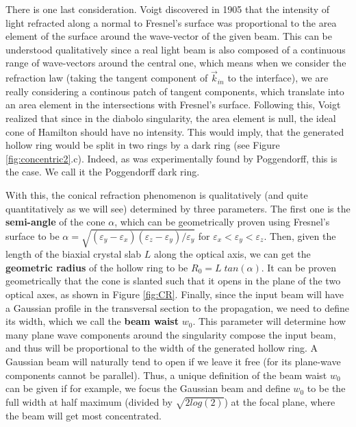 \documentclass[11pt, a4paper, twoside]{article} %
\begin{document}
There is one last consideration. Voigt discovered in 1905 \cite{voigt, Jeffrey} that the intensity of light refracted along a normal to Fresnel's surface was proportional to the area element of the surface around the wave-vector of the given beam. This can be understood qualitatively since a real light beam is also composed of a continuous range of wave-vectors around the central one, which means when we consider the refraction law (taking the tangent component of $\vec{k}_{in}$ to the interface), we are really considering a continous patch of tangent components, which translate into an area element in the intersections with Fresnel's surface. Following this, Voigt realized that since in the diabolo singularity, the area element is null, the ideal cone of Hamilton should have no intensity. This would imply, that the generated hollow ring would be split in two rings by a dark ring (see Figure \ref{fig:concentric2}.c). Indeed, as was experimentally found by Poggendorff, this is the case. We call it the Poggendorff dark ring.

With this, the conical refraction phenomenon is qualitatively (and quite quantitatively as we will see) determined by three parameters. The first one is the {\bf semi-angle} of the cone $\alpha$, which can be geometrically proven using Fresnel's surface to be $\alpha=\sqrt{(\varepsilon_y-\varepsilon_x)(\varepsilon_z-\varepsilon_y)/\varepsilon_y}$ for $\varepsilon_x<\varepsilon_y<\varepsilon_z$. Then, given the length of the biaxial crystal slab $L$ along the optical axis, we can get the {\bf geometric radius} of the hollow ring to be $R_0=L\;tan(\alpha)$. It can be proven geometrically that the cone is slanted such that it opens in the plane of the two optical axes, as shown in Figure \ref{fig:CR}. Finally, since the input beam will have a Gaussian profile in the transversal section to the propagation, we need to define its width, which we call the {\bf beam waist} $w_0$. This parameter will determine how many plane wave components around the singularity compose the input beam, and thus will be proportional to the width of the generated hollow ring. A Gaussian beam will naturally tend to open if we leave it free (for its plane-wave components cannot be parallel). Thus, a unique definition of the beam waist $w_0$ can be given if for example, we focus the Gaussian beam and define $w_0$ to be the full width at half maximum (divided by $\sqrt{2log(2)}$) at the focal plane, where the beam will get most concentrated.
\end{document}
